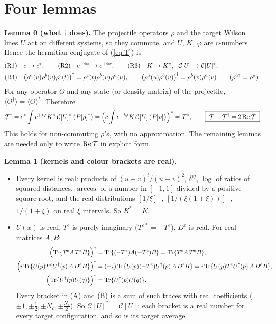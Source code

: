 \documentclass[10pt]{article}
\begin{document}
\section{Four lemmas}
\noindent\textbf{Lemma 0 (what $\dagger$ does).} The projectile operators $\rho$ and the target Wilson lines $U$ act on different systems, so they commute, and $U$, $K$, $\varphi$ are c-numbers. Hence the hermitian conjugate of (\ref{eq:T}) is
\begin{align}
&\text{(R1)}\quad c\to c^{*},\qquad \text{(R2)}\quad e^{-i\varphi}\to e^{+i\varphi},\qquad \text{(R3)}\quad K\to K^{*},\ \ \mathcal{C}[U]\to\mathcal{C}[U]^{*},\notag\\
&\text{(R4)}\quad \big(\rho^{a}(u)\rho^{b}(v)\rho^{c}(t)\big)^{\dagger}=\rho^{c}(t)\rho^{b}(v)\rho^{a}(u),\qquad\big(\rho^{a}(u)\rho^{b}(v)\big)^{\dagger}=\rho^{b}(v)\rho^{a}(u)\qquad(\rho^{a\dagger}=\rho^{a}).
\end{align}
For any operator $O$ and any state (or density matrix) of the projectile, $\langle O^{\dagger}\rangle=\langle O\rangle^{*}$. Therefore
\begin{equation}
\mathcal{T}^{\dagger}=c^{*}\int e^{+i\varphi}K^{*}\,\mathcal{C}[U]^{*}\,\big\langle P[\rho]^{\dagger}\big\rangle=\Big(c\int e^{-i\varphi}K\,\mathcal{C}[U]\,\big\langle P[\rho]\big\rangle\Big)^{*}=\mathcal{T}^{*},\qquad\boxed{\ \mathcal{T}+\mathcal{T}^{\dagger}=2\,{\rm Re}\,\mathcal{T}\ }\label{eq:2Re}
\end{equation}
This holds for non-commuting $\rho$'s, with no approximation. The remaining lemmas are needed only to write ${\rm Re}\,\mathcal{T}$ in explicit form.

\medskip\noindent\textbf{Lemma 1 (kernels and colour brackets are real).}
\begin{itemize}
\item Every kernel is real: products of $(u-v)^{i}/(u-v)^{2}$, $\delta^{ij}$, $\log$ of ratios of squared distances, $\arccos$ of a number in $[-1,1]$ divided by a positive square root, and the real distributions $[1/\xi]_{+}$, $[1/(\xi(1+\xi))]_{+}$, $1/(1+\xi)$ on real $\xi$ intervals. So $K^{*}=K$.
\item $U(x)$ is real, $T^{e}$ is purely imaginary ($T^{e*}=-T^{e}$), $D^{e}$ is real. For real matrices $A,B$:
\begin{align}
\Big({\rm Tr}\{T^{e}A\,T^{e}B\}\Big)^{*}&={\rm Tr}\{(-T^{e})A(-T^{e})B\}={\rm Tr}\{T^{e}A\,T^{e}B\},\\
\Big(i\,{\rm Tr}\{U(p)T^{e}U^{\dagger}(p)\,A\,D^{e}B\}\Big)^{*}&=(-i)\,{\rm Tr}\{U(p)(-T^{e})U^{\dagger}(p)\,A\,D^{e}B\}=i\,{\rm Tr}\{U(p)T^{e}U^{\dagger}(p)\,A\,D^{e}B\},\\
\Big({\rm Tr}\{U^{\dagger}(p)U(q)\}\Big)^{*}&={\rm Tr}\{U^{\dagger}(p)U(q)\}.
\end{align}
Every bracket in (A) and (B) is a sum of such traces with real coefficients ($\pm1,\pm\tfrac12,\pm N_{c},\pm\tfrac{N_{c}}{2}$). So $\mathcal{C}[U]^{*}=\mathcal{C}[U]$: each bracket is a real number for every target configuration, and so is its target average.
\end{itemize}
\end{document}
